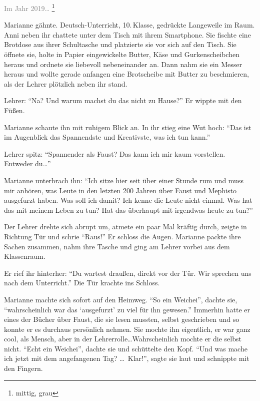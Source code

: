 \label{cha:2019_marianne}

\textcolor{gray}{Im Jahr 2019\dots} \footnote{mittig, grau}

Marianne gähnte. Deutsch-Unterricht, 10.\,Klasse, gedrückte Langeweile im Raum.
Anni neben ihr chattete unter dem Tisch mit ihrem Smartphone.
Sie fischte eine Brotdose aus ihrer Schultasche und platzierte sie vor sich auf den Tisch.
Sie öffnete sie, holte in Papier eingewickelte Butter, Käse und Gurkenscheibchen heraus und ordnete sie liebevoll nebeneinander an.
Dann nahm sie ein Messer heraus und wollte gerade anfangen eine Brotscheibe mit Butter zu beschmieren, als der Lehrer plötzlich neben ihr stand.


Lehrer: \enquote{Na? Und warum machst du das nicht zu Hause?} Er wippte mit den Füßen.

Marianne schaute ihn mit ruhigem Blick an.
In ihr stieg eine Wut hoch: \enquote{Das ist im Augenblick das Spannendste und Kreativste, was ich tun kann.}

Lehrer spitz: \enquote{Spannender als Faust? Das kann ich mir kaum vorstellen.
Entweder du\dots}

Marianne unterbrach ihn: \enquote{Ich sitze hier seit über einer Stunde rum und muss mir anhören, was Leute in den letzten 200 Jahren über Faust und Mephisto ausgefurzt haben.
Was soll ich damit?
Ich kenne die Leute nicht einmal.
Was hat das mit meinem Leben zu tun?
Hat das überhaupt mit irgendwas heute zu tun?}

Der Lehrer drehte sich abrupt um, atmete ein paar Mal kräftig durch, zeigte in Richtung Tür und schrie \enquote{Raus!}
Er schloss die Augen.
Marianne packte ihre Sachen zusammen, nahm ihre Tasche und ging am Lehrer vorbei aus dem Klassenraum.

Er rief ihr hinterher: \enquote{Du wartest draußen, direkt vor der Tür.
Wir sprechen uns nach dem Unterricht.}
Die Tür krachte ins Schloss.

Marianne machte sich sofort auf den Heimweg.
\enquote{So ein Weichei}, dachte sie, \enquote{wahrscheinlich war das \enquote{ausgefurzt} zu viel für ihn gewesen.} Immerhin hatte er eines der Bücher über Faust, die sie lesen mussten, selbst geschrieben und so konnte er es durchaus persönlich nehmen.
Sie mochte ihn eigentlich, er war ganz cool, als Mensch, aber in der Lehrerrolle\dots Wahrscheinlich mochte er die selbst nicht.
\enquote{Echt ein Weichei}, dachte sie und schüttelte den Kopf.
\enquote{Und was mache ich jetzt mit dem angefangenen Tag? \dots\
Klar!}, sagte sie laut und schnippte mit den Fingern.

